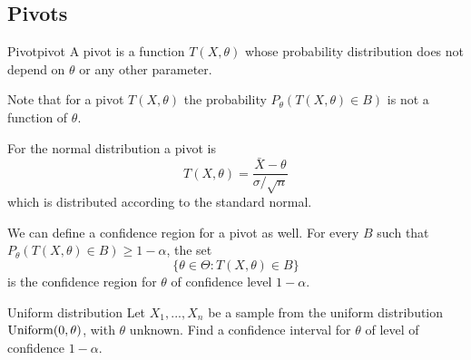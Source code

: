 \documentclass[12pt]{extarticle}
\newcommand{\Uniform}{{\operatorfont Uniform}}
\begin{document}
\subsection{Pivots}

\begin{definition}{Pivot}{pivot}
	A pivot is a function $T(X, \theta)$ whose probability distribution does not depend on $\theta$ or any other parameter.
\end{definition}

Note that for a pivot $T(X, \theta)$ the probability $P_\theta(T(X, \theta) \in B)$ is not a function of $\theta$.

For the normal distribution a pivot is
\begin{equation}
	T(X, \theta) = \frac{\bar X - \theta}{\sigma /\sqrt{n}}
\end{equation}
which is distributed according to the standard normal.

We can define a confidence region for a pivot as well.
For every $B$ such that $P_\theta(T(X, \theta) \in B) \geq 1- \alpha$, the set
\begin{equation}
	\{ \theta \in \Theta : T(X, \theta) \in B \}
\end{equation}
is the confidence region for $\theta$ of confidence level $1- \alpha$.

\begin{example}{Uniform distribution}{}
	Let $X_1,...,X_n$ be a sample from the uniform distribution $\Uniform(0,\theta)$, with $\theta$ unknown.
	Find a confidence interval for $\theta$ of level of confidence $1 - \alpha$.
\end{example}
\end{document}
